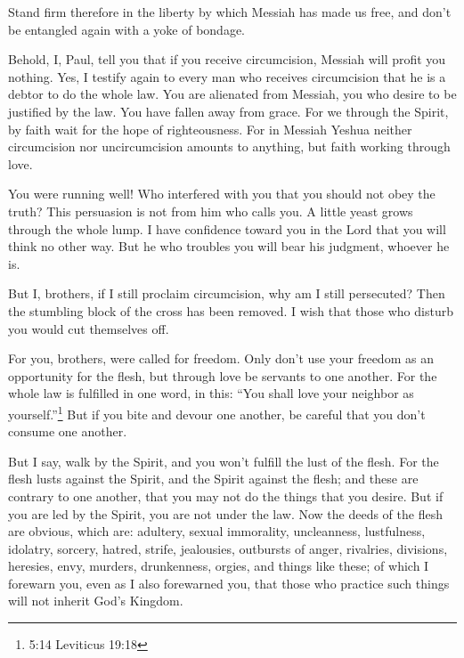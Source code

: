 \mychapter{} \myverse*{}Stand firm therefore in the liberty by which Messiah has made us
free, and don’t be entangled again with a yoke of bondage.

\myverse{}Behold, I, Paul, tell you that if you receive circumcision, Messiah
will profit you nothing.
\myverse{}Yes, I testify again to every man who receives circumcision that he is a debtor
to do the whole law.
\myverse{}You are alienated from Messiah, you who desire to be justified by the law. You
have fallen away from grace.
\myverse{}For we through the Spirit, by faith wait for the hope of righteousness.
\myverse{}For in Messiah Yeshua neither circumcision nor uncircumcision amounts to anything,
but faith working through love.

\myverse{}You were running well! Who interfered with you that you should
not obey the truth?
\myverse{}This persuasion is not from him who calls you.
\myverse{}A little yeast grows through the whole lump.
\myverse{}I have confidence toward you in the Lord that you will think no other way.
But he who troubles you will bear his judgment, whoever he is.

\myverse{}But I, brothers, if I still proclaim circumcision, why am I still
persecuted? Then the stumbling block of the cross has been removed.
\myverse{}I wish that those who disturb you would cut themselves off.

\myverse{}For you, brothers, were called for freedom. Only don’t use your
freedom as an opportunity for the flesh, but through love be servants to one another.
\myverse{}For the whole law is fulfilled in one word, in this: “You shall love your
neighbor as yourself.”\footnote{5:14 Leviticus 19:18}
\myverse{}But if you bite and devour one another, be careful that you don’t consume
one another.

\myverse{}But I say, walk by the Spirit, and you won’t fulfill the lust
of the flesh.
\myverse{}For the flesh lusts against the Spirit, and the Spirit against the flesh;
and these are contrary to one another, that you may not do the things that you desire.
\myverse{}But if you are led by the Spirit, you are not under the law.
\myverse{}Now the deeds of the flesh are obvious, which are: adultery, sexual immorality,
uncleanness, lustfulness,
\myverse{}idolatry, sorcery, hatred, strife, jealousies, outbursts of anger, rivalries,
divisions, heresies,
\myverse{}envy, murders, drunkenness, orgies, and things like these; of which I forewarn
you, even as I also forewarned you, that those who practice such things will not inherit God’s Kingdom.

